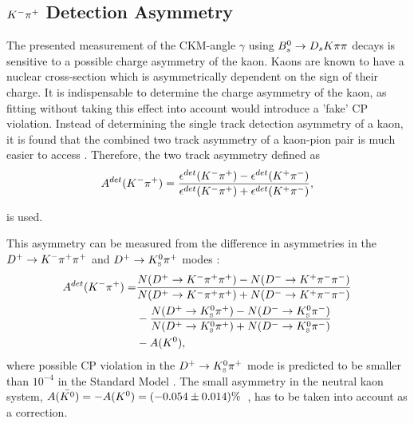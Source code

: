 

\clearpage
\subsection{${{K}^-}{{\pi}^+}$ Detection Asymmetry}
\label{sec:KpiAsym}

The presented measurement of the CKM-angle $\gamma$ using ${{B}^0_{s}}\rightarrow{\ensuremath{{D}_{s}}}{\ensuremath{K}}{\ensuremath{\pi}}{\ensuremath{\pi}}$ decays is sensitive to a possible charge asymmetry of the kaon. 
Kaons are known to have a nuclear cross-section which is asymmetrically dependent on the sign of their charge. 
It is indispensable to determine the charge asymmetry of the kaon, as fitting without taking this effect into account would introduce a 'fake' CP violation. 
Instead of determining the single track detection asymmetry of a kaon, it is found that the combined two track asymmetry of a kaon-pion pair is much easier to access \cite{Gordon:1482647} . 
Therefore, the two track asymmetry defined as 
\begin{equation}
A^{det}(\Km\pip) = \frac{\epsilon^{det}(\Km\pip) -\epsilon^{det}(\Kp\pim)}{\epsilon^{det}(\Km\pip) + \epsilon^{det}(\Kp\pim)},
\label{eq:KpiDetAsymDef}
\end{equation}

is used.

This asymmetry can be measured from the difference in asymmetries in the ${{D}^+}\rightarrow{\ensuremath{{K}^-}}{\ensuremath{{\pi}^+}}{\ensuremath{{\pi}^+}}$ and ${{D}^+}\rightarrow{\ensuremath{{K}^0_{\mathrm{ \scriptscriptstyle S}}}}{\ensuremath{{\pi}^+}}$ modes
\cite{Davis:2310213}:
\begin{equation}
\begin{split}
A^{det}(\Km\pip) = & \frac{N(\Dp\to\Km\pip\pip) - N(\Dm\to\Kp\pim\pim)}{N(\Dp\to\Km\pip\pip) + N(\Dm\to\Kp\pim\pim)} \\
                  & - \frac{N(\Dp\to\KS\pip) - N(\Dm\to\KS\pim)}{N(\Dp\to\KS\pip) + N(\Dm\to\KS\pim)} \\
                  & - A(\Kz),
\end{split}
\label{eq:KpiDetAsymDef}
\end{equation}
where possible CP violation in the ${{D}^+}\rightarrow{\ensuremath{{K}^0_{\mathrm{ \scriptscriptstyle S}}}}{\ensuremath{{\pi}^+}}$ mode is predicted to be smaller than $10^{-4}$ in the Standard Model \cite{Bigi:1994aw}.
The small asymmetry in the neutral kaon system, $A(\bar{{{K}^0}})= - A({{K}^0}) =  (-0.054 \pm 0.014)\%$~\cite{Davis:2310213}, has to be taken into account as a correction. 

